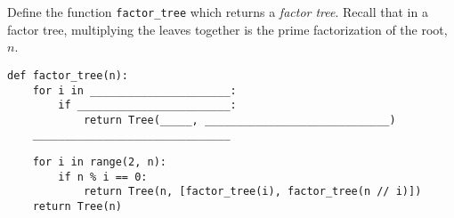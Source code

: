 \begin{blocksection}
\question Define the function \lstinline$factor_tree$ which returns a \emph{factor tree}. Recall that in a factor tree, multiplying the leaves together is the prime factorization of the root, $n$. \\

\begin{lstlisting}
def factor_tree(n):
    for i in ______________________:
        if ________________________:
            return Tree(_____, _____________________________)
    _______________________________
\end{lstlisting}

\begin{solution}[0.5in]
\begin{lstlisting}
    for i in range(2, n):
        if n % i == 0:
            return Tree(n, [factor_tree(i), factor_tree(n // i)])
    return Tree(n)
\end{lstlisting}
\end{solution}
\end{blocksection}
